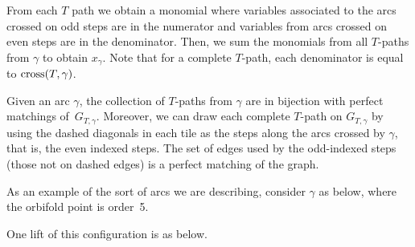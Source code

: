From each $T$ path we obtain a monomial where variables associated to the arcs crossed on odd steps are in the numerator and variables from arcs crossed on even steps are in the denominator. Then, we sum the monomials from all $T$-paths from $\gamma$ to obtain $x_\gamma$. Note that for a complete $T$-path, each denominator is equal to ${\rm cross}(T,\gamma)$.

Given an arc $\gamma$, the collection of $T$-paths from $\gamma$ are in bijection with perfect matchings of~$G_{T,\gamma}$. Moreover, we can draw each complete $T$-path on $G_{T,\gamma}$ by using the dashed diagonals in each tile as the steps along the arcs crossed by $\gamma$, that is, the even indexed steps. The set of edges used by the odd-indexed steps (those not on dashed edges) is a perfect matching of the graph.

As an example of the sort of arcs we are describing, consider $\gamma$ as below, where the orbifold point is order~5.

\begin{center}
\end{center}

One lift of this configuration is as below.

